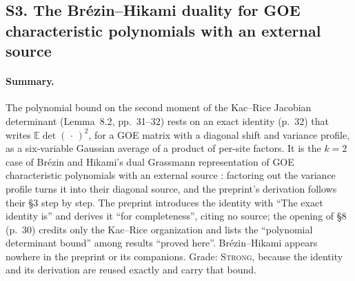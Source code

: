 \documentclass[11pt]{article}
\newcommand{\E}{\mathbb{E}}
\newcommand{\ploc}[2]{#1}
\newcommand{\sloc}[2]{\cite[#2]{#1}}
\newcommand{\grade}[1]{\textsc{#1}}
\begin{document}
\subsection{S3. The Br\'ezin--Hikami duality for GOE characteristic polynomials with an external source}\label{f:S3}

\paragraph{Summary.}
The polynomial bound on the second moment of the Kac--Rice Jacobian
determinant \ploc{(Lemma~8.2, pp.~31--32)}{profile-roots.tex:95--192} rests on
an exact identity \ploc{(p.~32)}{profile-roots.tex:152--170} that writes
$\E\det(\,\cdot\,)^2$, for a GOE matrix with a diagonal shift and variance
profile, as a six-variable Gaussian average of a product of per-site factors.
It is the $k=2$ case of Br\'ezin and Hikami's dual
Grassmann representation of GOE characteristic polynomials with an external
source \sloc{BrezinHikami2001-CharPolyRealSymmetric}{\S6, eqs.~(88)--(89),
pp.~19--20, with (43), p.~10}: factoring out the variance profile turns it into
their diagonal source, and the preprint's derivation follows their \S3 step by
step. The preprint introduces the identity with ``The exact identity is'' and
derives it ``for completeness'', citing no source; the opening of \S8
\ploc{(p.~30)}{profile-roots.tex:10--15} credits only the Kac--Rice
organization and lists the ``polynomial determinant bound'' among results
``proved here''. Br\'ezin--Hikami appears nowhere in the preprint or its
companions. Grade: \grade{Strong}, because the identity and its derivation are
reused exactly and carry that bound.
\end{document}
